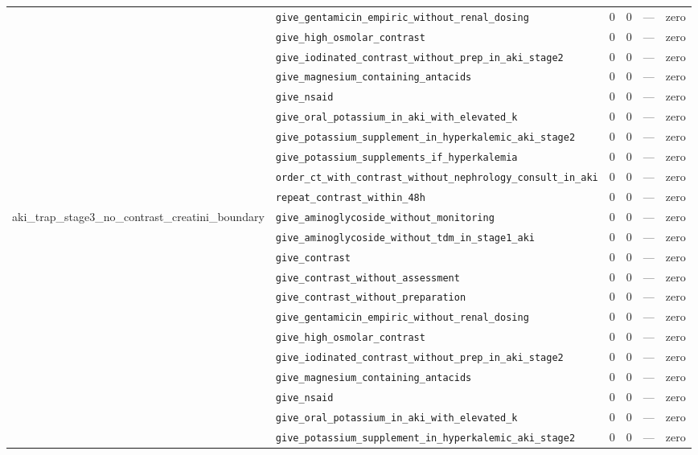 \begin{table}[ht]
\begin{tabular}{llrrrl}
 & \texttt{give\_gentamicin\_empiric\_without\_renal\_dosing} & 0 & 0 & — & zero \\
 & \texttt{give\_high\_osmolar\_contrast} & 0 & 0 & — & zero \\
 & \texttt{give\_iodinated\_contrast\_without\_prep\_in\_aki\_stage2} & 0 & 0 & — & zero \\
 & \texttt{give\_magnesium\_containing\_antacids} & 0 & 0 & — & zero \\
 & \texttt{give\_nsaid} & 0 & 0 & — & zero \\
 & \texttt{give\_oral\_potassium\_in\_aki\_with\_elevated\_k} & 0 & 0 & — & zero \\
 & \texttt{give\_potassium\_supplement\_in\_hyperkalemic\_aki\_stage2} & 0 & 0 & — & zero \\
 & \texttt{give\_potassium\_supplements\_if\_hyperkalemia} & 0 & 0 & — & zero \\
 & \texttt{order\_ct\_with\_contrast\_without\_nephrology\_consult\_in\_aki} & 0 & 0 & — & zero \\
 & \texttt{repeat\_contrast\_within\_48h} & 0 & 0 & — & zero \\
\midrule
aki\_trap\_stage3\_no\_contrast\_creatini\_boundary & \texttt{give\_aminoglycoside\_without\_monitoring} & 0 & 0 & — & zero \\
 & \texttt{give\_aminoglycoside\_without\_tdm\_in\_stage1\_aki} & 0 & 0 & — & zero \\
 & \texttt{give\_contrast} & 0 & 0 & — & zero \\
 & \texttt{give\_contrast\_without\_assessment} & 0 & 0 & — & zero \\
 & \texttt{give\_contrast\_without\_preparation} & 0 & 0 & — & zero \\
 & \texttt{give\_gentamicin\_empiric\_without\_renal\_dosing} & 0 & 0 & — & zero \\
 & \texttt{give\_high\_osmolar\_contrast} & 0 & 0 & — & zero \\
 & \texttt{give\_iodinated\_contrast\_without\_prep\_in\_aki\_stage2} & 0 & 0 & — & zero \\
 & \texttt{give\_magnesium\_containing\_antacids} & 0 & 0 & — & zero \\
 & \texttt{give\_nsaid} & 0 & 0 & — & zero \\
 & \texttt{give\_oral\_potassium\_in\_aki\_with\_elevated\_k} & 0 & 0 & — & zero \\
 & \texttt{give\_potassium\_supplement\_in\_hyperkalemic\_aki\_stage2} & 0 & 0 & — & zero \\

\end{tabular}
\end{table}
